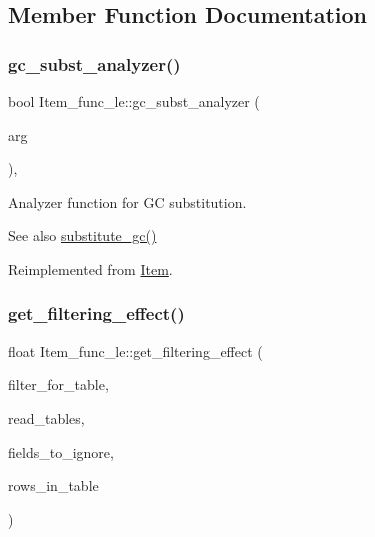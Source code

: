 \subsection{Member Function Documentation}
\mbox{\label{classItem__func__le_a1ee55d9e7ec7f51098181a95c377104e}} 
\subsubsection{\texorpdfstring{gc\+\_\+subst\+\_\+analyzer()}{gc\_subst\_analyzer()}}
{\footnotesize\ttfamily bool Item\+\_\+func\+\_\+le\+::gc\+\_\+subst\+\_\+analyzer (\begin{DoxyParamCaption}\item[{uchar $\ast$$\ast$}]{arg }\end{DoxyParamCaption})\hspace{0.3cm}{\ttfamily [inline]}, {\ttfamily [virtual]}}

Analyzer function for GC substitution. \begin{DoxySeeAlso}{See also}
\mbox{\hyperlink{group__Query__Optimizer_gaa95a062cdd785687a638e01d7ad85d11}{substitute\+\_\+gc()}} 
\end{DoxySeeAlso}


Reimplemented from \mbox{\hyperlink{classItem_aea5d6f41e9cd5d17d8e6e8d44bee9c3e}{Item}}.

\mbox{\label{classItem__func__le_a87166f592eb61ea3127bb9f00bca10d7}} 
\subsubsection{\texorpdfstring{get\+\_\+filtering\+\_\+effect()}{get\_filtering\_effect()}}
{\footnotesize\ttfamily float Item\+\_\+func\+\_\+le\+::get\+\_\+filtering\+\_\+effect (\begin{DoxyParamCaption}\item[{table\+\_\+map}]{filter\+\_\+for\+\_\+table,  }\item[{table\+\_\+map}]{read\+\_\+tables,  }\item[{const M\+Y\+\_\+\+B\+I\+T\+M\+AP $\ast$}]{fields\+\_\+to\+\_\+ignore,  }\item[{double}]{rows\+\_\+in\+\_\+table }\end{DoxyParamCaption})\hspace{0.3cm}{\ttfamily [virtual]}}


